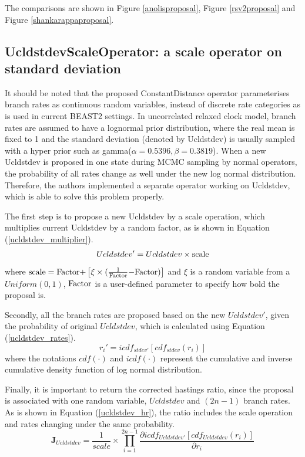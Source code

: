 \documentclass{bmcart}
\begin{document}
\begin{backmatter}
The comparisons are shown in Figure \ref{anolisproposal}, Figure \ref{rsv2proposal} and Figure \ref{shankarappaproposal}.


\subsection*{UcldstdevScaleOperator: a scale operator on standard deviation}\label{UcldstdevScaler}

It should be noted that the proposed ConstantDistance operator parameterises branch rates as continuous random variables, instead of discrete rate categories as is used in current BEAST2 settings. In uncorrelated relaxed clock model, branch rates are assumed to have a lognormal prior distribution, where the real mean is fixed to 1 and the standard deviation (denoted by Ucldstdev) is usually sampled with a hyper prior such as gamma($\alpha = 0.5396, \beta = 0.3819$). When a new Ucldstdev is proposed in one state during MCMC sampling by normal operators, the probability of all rates change as well under the new log normal distribution. Therefore, the authors implemented a separate operator working on Ucldstdev, which is able to solve this problem properly. 

The first step is to propose a new Ucldstdev by a scale operation, which multiplies  current Ucldstdev by a random factor, as is shown in Equation (\ref{ucldstdev_multiplier}).
\begin{equation}\label{ucldstdev_multiplier}
Ucldstdev' = Ucldstdev \times {\rm{scale}}
\end{equation}
where ${\rm{scale = Factor  +  }}\left[ {\xi  \times {\rm{(}}\frac{1}{{{\rm{Factor}}}}{\rm{  -  Factor)}}} \right]$ and  $\xi$ is a random variable from a $Uniform(0,1)$,  ${\rm{Factor}}$ is a user-defined parameter to specify how bold the proposal is.

Secondly, all the branch rates are proposed based on the new $Ucldstdev'$, given the probability of original $Ucldstdev$, which is calculated using Equation (\ref{ucldstdev_rates}).
\begin{equation}\label{ucldstdev_rates}
r_{i}' = icd{f_{stdev'}}\left[ {cd{f_{stdev}}({r_i})} \right]
\end{equation}
where the notations $cdf(\cdot)$ and $icdf(\cdot)$ represent the cumulative and inverse cumulative density function of log normal distribution.

Finally, it is important to return the corrected hastings ratio, since the proposal is associated with one random variable, $Ucldstdev$ and $(2n-1)$ branch rates. As is shown in Equation (\ref{ucldstdev_hr}), the ratio includes the scale operation and rates changing under the same probability.
\begin{equation}\label{ucldstdev_hr}
{{\mathbf{J}}_{Ucldstdev}} = \frac{1}{{scale}} \times \prod\limits_{i = 1}^{2n - 1} {\frac{{\partial icd{f_{Ucldstdev'}}[cd{f_{Ucldstdev}}({r_i})]}}{{\partial {r_i}}}}
\end{equation}


\end{backmatter}
\end{document}

